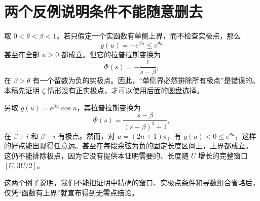 \section{两个反例说明条件不能随意删去}
取 $0<\theta<\beta<1$。若只假定一个实函数有单侧上界，而不检查实极点，那么
\[
g(u)=-e^{\beta u}\le e^{\theta u}
\]
甚至在全部 $u\ge0$ 都成立。但它的拉普拉斯变换为
\[
\Phi(s)=-\frac1{s-\beta},
\]
在 $\beta>\theta$ 有一个留数为负的实极点。因此，“单侧界必然排除所有极点”是错误的。本稿先证明 $\zeta$ 情形没有正实极点，才可以使用后面的圆盘选择。

另取 $g(u)=e^{\beta u}\cos u$，其拉普拉斯变换为
\[
\Phi(s)=\frac{s-\beta}{(s-\beta)^2+1},
\]
在 $\beta+i$ 和 $\beta-i$ 有极点。然而，对
$u=(2n+1)\pi$，有 $g(u)<0\le e^{\theta u}$，这样的好点能出现得任意远。甚至在每段余弦为负的固定长度区间上，上界都成立。
这仍不能排除极点，因为它没有提供本证明需要的、长度随 $U$ 增长的完整窗口 $[U,3U/2]$。

这两个例子说明，我们不能把证明中精确的窗口、实极点条件和导数组合省略后，仅凭“函数有上界”就宣布得到无零点结论。

